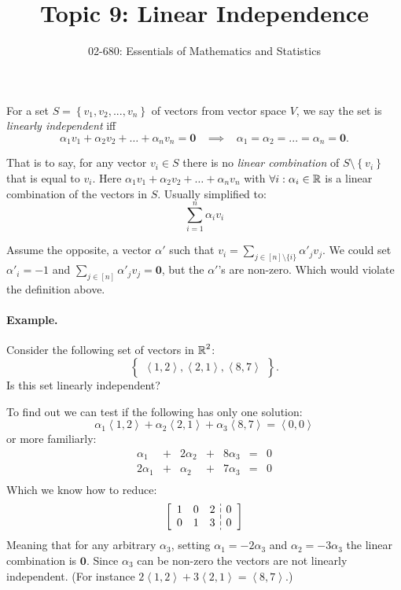 


\title{Topic 9: Linear Independence}
\author{02-680: Essentials of Mathematics and Statistics}


\maketitle

For a set $S=\left\{v_1,v_2,...,v_n\right\}$ of vectors from vector space $V$, 
we say the set is \emph{linearly independent} iff 
\[
\alpha_1v_1 + \alpha_2v_2 + \hdots + \alpha_nv_n = \mathbf{0} \;\;\;\implies\;\;\; \alpha_1=\alpha_2=...=\alpha_n = \mathbf{0}.
\]

That is to say, for any vector $v_i\in S$ there is no \emph{linear combination} of $S\setminus\left\{v_i\right\}$ that is equal to $v_i$. 
Here $\alpha_1v_1 + \alpha_2v_2 + \hdots + \alpha_nv_n$ with $\forall i: \alpha_i\in\operatorname{\mathbb{R}}$ is a linear combination of the vectors in $S$.
Usually simplified to:  \[\sum_{i=1}^n \alpha_iv_i\]

Assume the opposite, a vector $\alpha'$ such that $v_i = \sum_{j\in [n]\setminus\{i\}}\alpha'_jv_j$. 
We could set $\alpha'_i=-1$
and $\sum_{j\in [n]}\alpha'_jv_j=\mathbf{0}$, but the $\alpha'$'s are non-zero. 
Which would violate the definition above.

\paragraph{Example.} Consider the following set of vectors in $\operatorname{\mathbb{R}}^2$:
\[\left\{\begin{matrix}
\left\langle1,2\right\rangle,
\left\langle2,1\right\rangle,
\left\langle8,7\right\rangle
\end{matrix}\right\}.\]
Is this set linearly independent? 

To find out we can test if the following has only one solution: 
\[\alpha_1 \left\langle1,2\right\rangle +
\alpha_2 \left\langle2,1\right\rangle +
\alpha_3 \left\langle8,7\right\rangle =
\left\langle0,0\right\rangle\]
or more familiarly: 
\[
\begin{array}{rcrcrcr}
\alpha_1 & + & 2\alpha_2 & + & 8 \alpha_3 & = & 0\\
2\alpha_1 & + & \alpha_2 & + & 7 \alpha_3 & = & 0\\
\end{array}
\]
Which we know how to reduce: 
\[
\left[
\begin{array}{ccc;{4pt/2pt}c}
1 & 0 & 2 & 0\\
0 & 1 & 3 & 0\\
\end{array}
\right]
\]
Meaning that for any arbitrary $\alpha_3$, setting $\alpha_1 = -2\alpha_3$ and $\alpha_2 = -3\alpha_3$ the linear combination is $\mathbf{0}$. 
Since $\alpha_3$ can be non-zero the vectors are not linearly independent. 
(For instance $2 \left\langle1,2\right\rangle +
3 \left\langle2,1\right\rangle=
 \left\langle8,7\right\rangle$.)



